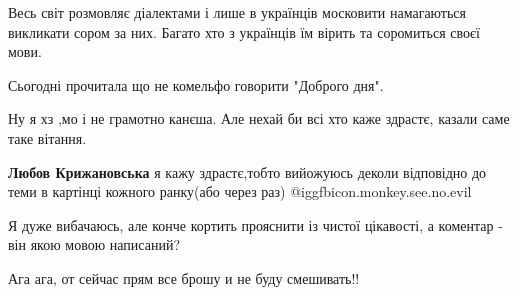  

Весь світ розмовляє діалектами і лише в українців московити намагаються
викликати сором за них. Багато хто з українців їм вірить та соромиться своєї
мови.


 

Сьогодні прочитала що не комельфо говорити "Доброго дня".

Ну я хз ,мо і не грамотно канєша. Але нехай би всі хто каже здрастє, казали
саме таке вітання.

\begin{itemize} %
 
\textbf{Любов Крижановська} я кажу здрастє,тобто вийожуюсь деколи відповідно до теми в картінці кожного ранку(або через раз) @igg{fbicon.monkey.see.no.evil} 
\end{itemize} %

 
Я дуже вибачаюсь, але конче кортить прояснити із чистої цікавості, а коментар -
він якою мовою написаний?

 
Ага ага, от сейчас прям все брошу и не буду смешивать!!

 
